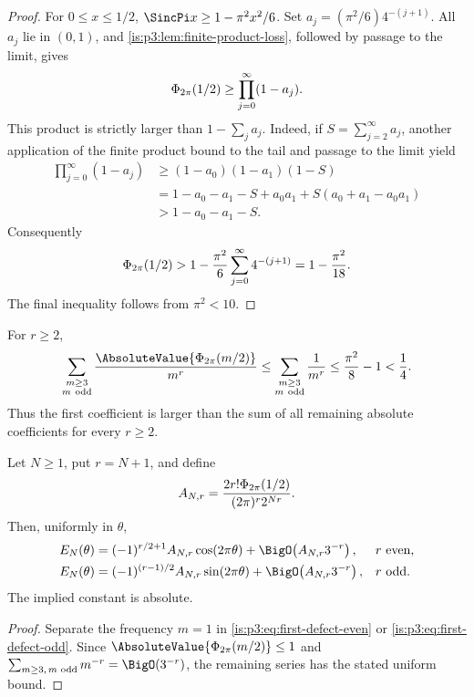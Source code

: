 \begin{proof}
For $0\le x\le1/2$, $\SincPi x\ge1-\pi^2x^2/6$.  Set
$a_j=(\pi^2/6)4^{-(j+1)}$.  All $a_j$ lie in $(0,1)$, and
\cref{is:p3:lem:finite-product-loss}, followed by passage to the limit, gives
\[
 \Phi_{2\pi}(1/2)\ge\prod_{j=0}^{\infty}(1-a_j).
\]
This product is strictly larger than $1-\sum_ja_j$.  Indeed, if
$S=\sum_{j=2}^{\infty}a_j$, another application of the finite product bound
to the tail and passage to the limit yield
\begin{align*}
 \prod_{j=0}^{\infty}(1-a_j)
 &\ge(1-a_0)(1-a_1)(1-S)\\
 &=1-a_0-a_1-S
   +a_0a_1+S(a_0+a_1-a_0a_1)\\
 &>1-a_0-a_1-S.
\end{align*}
Consequently
\[
 \Phi_{2\pi}(1/2)>1-\frac{\pi^2}{6}\sum_{j=0}^{\infty}4^{-(j+1)}
 =1-\frac{\pi^2}{18}.
\]
The final inequality follows from $\pi^2<10$.
\end{proof}

For $r\ge2$,
\begin{equation}
 \sum_{\substack{m\ge3\\m\ \mathrm{odd}}}
 \frac{\AbsoluteValue{\PhiCyc(m/2)}}{m^r}
 \le\sum_{\substack{m\ge3\\m\ \mathrm{odd}}}\frac1{m^r}
 \le\frac{\pi^2}{8}-1<\frac14.
 \label{is:p3:eq:harmonic-tail-bound}
\end{equation}
Thus the first coefficient is larger than the sum of all remaining absolute coefficients for every $r\ge2$.

\begin{theorem}
\label{is:p3:thm:sinusoidal-asymptotics}
Let $N\ge1$, put $r=N+1$, and define
\begin{equation}
 A_{N,r}=\frac{2r!\Phi_{2\pi}(1/2)}{(2\pi)^r2^{Nr}}.
 \label{is:p3:eq:first-harmonic-amplitude}
\end{equation}
Then, uniformly in $\theta$,
\begin{align}
 E_N(\theta)
 &=(-1)^{r/2+1}A_{N,r}\cos(2\pi\theta)
 +\BigO\!\left(A_{N,r}3^{-r}\right),&&r\ \text{even},
 \label{is:p3:eq:cos-asymptotic}\\
 E_N(\theta)
 &=(-1)^{(r-1)/2}A_{N,r}\sin(2\pi\theta)
 +\BigO\!\left(A_{N,r}3^{-r}\right),&&r\ \text{odd}.
 \label{is:p3:eq:sin-asymptotic}
\end{align}
The implied constant is absolute.
\end{theorem}

\begin{proof}
Separate the frequency $m=1$ in \eqref{is:p3:eq:first-defect-even} or \eqref{is:p3:eq:first-defect-odd}.  Since $\AbsoluteValue{\PhiCyc(m/2)}\le1$ and
$\sum_{m\ge3,\,m\text{ odd}}m^{-r}=\BigO(3^{-r})$, the remaining series has the stated uniform bound.
\end{proof}

